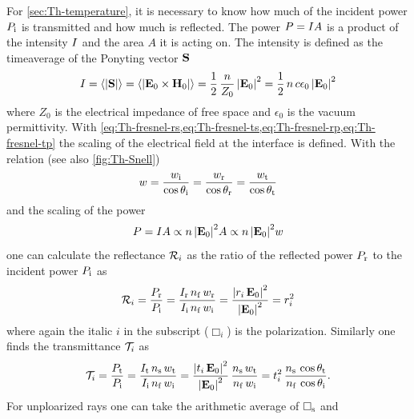 For \cref{sec:Th-temperature}, it is necessary to know how much of the incident 
power $P_{\mathrm{i}}$ is transmitted and how much is reflected. The power 
$P=I A$ is a product of the intensity $I$ and the area $A$ it 
is acting on. The intensity is defined as the timeaverage of the Ponyting 
vector $\vb{S}$
\begin{equation}
  I = \left\langle \abs{\vb{S}} \right\rangle = 
  \left\langle \abs{\vb{E}_{0}\times\vb{H}_{0}} \right\rangle = 
  \frac{1}{2}\,\frac{n}{Z_{0}}\,\abs{\vb{E}_{0}}^{2} = 
  \frac{1}{2}\,n\,c\epsilon_{0}\,\abs{\vb{E}_{0}}^{2}
\end{equation}
where $Z_{0}$ is the electrical impedance of free space and $\epsilon_{0}$ is 
the vacuum permittivity. With 
\cref{eq:Th-fresnel-rs,eq:Th-fresnel-ts,eq:Th-fresnel-rp,eq:Th-fresnel-tp} the 
scaling of the electrical field at the interface is defined. With the relation 
(see also \cref{fig:Th-Snell})
\begin{equation}
  w = \frac{w_{\mathrm{i}}}{\cos\theta_{\mathrm{i}}} = \frac{w_{\mathrm{r}}}{\cos\theta_{\mathrm{r}}} = 
  \frac{w_{\mathrm{t}}}{\cos\theta_{\mathrm{t}}}
  \label{eq:Th-area}
\end{equation}
and the scaling of the power
\begin{equation}
  P = I A \propto n\,\abs{\vb{E}_{0}}^{2}A \propto
  n\,\abs{\vb{E}_{0}}^{2}w
\end{equation}
one can calculate the reflectance $\mathcal{R}_{i}$ as the ratio of the reflected 
power $P_{\mathrm{r}}$ to the incident power $P_{\mathrm{i}}$ as
\begin{equation}
  \mathcal{R}_{i} = \frac{P_{\mathrm{r}}}{P_{\mathrm{i}}} = 
  \frac{I_{\mathrm{r}}\,n_{\mathrm{f}}\,w_{\mathrm{r}}}{I_{\mathrm{i}}\,n_{\mathrm{f}}\,w_{\mathrm{i}}} 
  =\frac{\abs{r_{i}\,\vb{E}_{0}}^{2}}{\abs{\vb{E}_{0}}^{2}} = 
  r_{i}^{2}
  \label{eq:Th-fresnelR}
\end{equation}
where again the italic $i$ in the subscript ($\Box_{i}$) is the polarization. 
Similarly one finds the transmittance $\mathcal{T}_{i}$ as
\begin{equation}
  \mathcal{T}_{i} = \frac{P_{\mathrm{t}}}{P_{\mathrm{i}}} = 
  \frac{I_{\mathrm{t}}\,n_{\mathrm{s}}\,w_{\mathrm{t}}}{I_{\mathrm{i}}\,n_{\mathrm{f}}\,w_{\mathrm{i}}} 
  =\frac{\abs{t_{i}\,\vb{E}_{0}}^{2}}{\abs{\vb{E}_{0}}^{2}}\,\frac{n_{\mathrm{s}}\,w_{\mathrm{t}}}{n_{\mathrm{f}}\,w_{\mathrm{i}}} 
  = t_{i}^{2}\,\frac{n_{\mathrm{s}}\,\cos\theta_{\mathrm{t}}}{n_{\mathrm{f}}\,\cos\theta_{\mathrm{i}}}.
  \label{eq:Th-fresnelT}
\end{equation}
For unploarized rays one can take the arithmetic average of $\Box_{\mathrm{s}}$ and 
